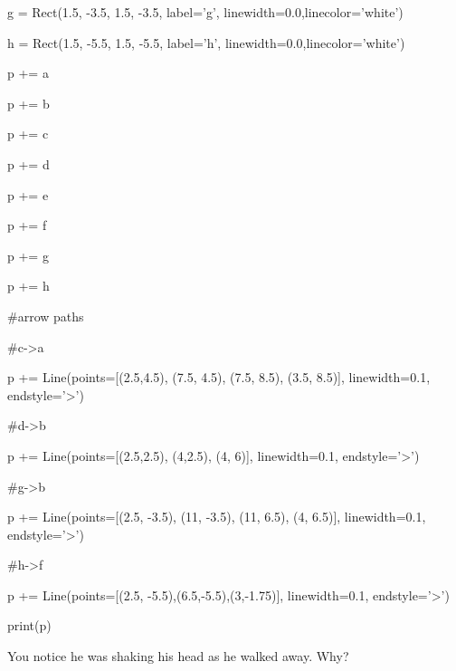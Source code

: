\begin{python}
g = Rect(1.5, -3.5, 1.5, -3.5, label='g', linewidth=0.0,linecolor='white')

h = Rect(1.5, -5.5, 1.5, -5.5, label='h', linewidth=0.0,linecolor='white')



p += a

p += b

p += c

p += d

p += e

p += f

p += g

p += h



#arrow paths

#c->a

p += Line(points=[(2.5,4.5), (7.5, 4.5), (7.5, 8.5), (3.5, 8.5)], linewidth=0.1, endstyle='>')

#d->b

p += Line(points=[(2.5,2.5), (4,2.5), (4, 6)], linewidth=0.1, endstyle='>')

#g->b

p += Line(points=[(2.5, -3.5), (11, -3.5), (11, 6.5), (4, 6.5)], linewidth=0.1, endstyle='>')

#h->f

p += Line(points=[(2.5, -5.5),(6.5,-5.5),(3,-1.75)], linewidth=0.1, endstyle='>')



print(p)

\end{python}



You notice he was shaking his head as he walked away. Why?

